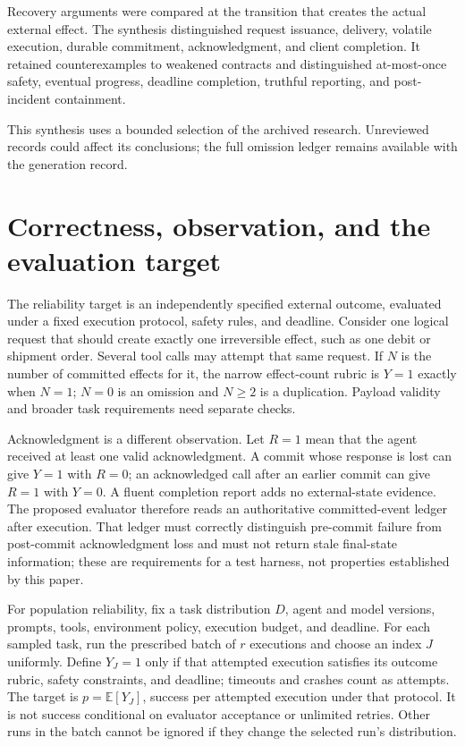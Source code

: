 \documentclass[11pt]{article}
\begin{document}
Recovery arguments were compared at the transition that creates the actual external effect. The synthesis distinguished request issuance, delivery, volatile execution, durable commitment, acknowledgment, and client completion. It retained counterexamples to weakened contracts and distinguished at-most-once safety, eventual progress, deadline completion, truthful reporting, and post-incident containment.

This synthesis uses a bounded selection of the archived research. Unreviewed records could affect its conclusions; the full omission ledger remains available with the generation record.
\section{Correctness, observation, and the evaluation target}
The reliability target is an independently specified external outcome, evaluated under a fixed execution protocol, safety rules, and deadline. Consider one logical request that should create exactly one irreversible effect, such as one debit or shipment order. Several tool calls may attempt that same request. If $N$ is the number of committed effects for it, the narrow effect-count rubric is $Y=1$ exactly when $N=1$; $N=0$ is an omission and $N\geq 2$ is a duplication. Payload validity and broader task requirements need separate checks.

Acknowledgment is a different observation. Let $R=1$ mean that the agent received at least one valid acknowledgment. A commit whose response is lost can give $Y=1$ with $R=0$; an acknowledged call after an earlier commit can give $R=1$ with $Y=0$. A fluent completion report adds no external-state evidence. The proposed evaluator therefore reads an authoritative committed-event ledger after execution. That ledger must correctly distinguish pre-commit failure from post-commit acknowledgment loss and must not return stale final-state information; these are requirements for a test harness, not properties established by this paper.

For population reliability, fix a task distribution $D$, agent and model versions, prompts, tools, environment policy, execution budget, and deadline. For each sampled task, run the prescribed batch of $r$ executions and choose an index $J$ uniformly. Define $Y_J=1$ only if that attempted execution satisfies its outcome rubric, safety constraints, and deadline; timeouts and crashes count as attempts. The target is $p=\mathbb{E}[Y_J]$, success per attempted execution under that protocol. It is not success conditional on evaluator acceptance or unlimited retries. Other runs in the batch cannot be ignored if they change the selected run's distribution.
\end{document}
